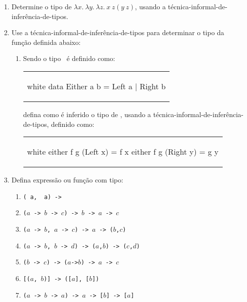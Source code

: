 \begin{enumerate}

\item Determine o tipo de $\lambda x.\:\lambda y.\:\lambda z.\:x\: z
  (y\: z)$, usando a técnica-informal-de-inferência-de-tipos.

\item Use a técnica-informal-de-inferência-de-tipos para determinar o
  tipo da função  definida abaixo:

  \begin{enumerate}

  \item Sendo o tipo \Either\ é definido como:
\begin{center}
\begin{tabular}{l}
\begin{alg}{.9\textwidth}{white}
  data Either a b = Left a | Right b
\end{alg}
\end{tabular}
\end{center}  
defina como é inferido o tipo de , usando a
técnica-informal-de-inferência-de-tipos, definido como:
\begin{center}
\begin{tabular}{l}
\begin{alg}{.9\textwidth}{white}
    either f g (Left x)  =  f x
    either f g (Right y) =  g y
\end{alg}
\end{tabular}
\end{center}  

  \end{enumerate}
  
\item Defina expressão ou função com tipo:

  \begin{enumerate}

  \item {\tt (\Ord\ a, \Show\ a) -> \String}

  \item {\tt ($a$ -> $b$ -> $c$) -> $b$ -> $a$ -> $c$}

  \item {\tt ($a$ -> $b$, $a$ -> $c$) -> $a$ -> ($b$,$c$)}

  \item {\tt ($a$ -> $b$, $b$ -> $d$) -> ($a$,$b$) -> ($c$,$d$)}

  \item {\tt ($b$ -> $c$) -> ($a$->$b$) -> $a$ -> $c$}
  
  \item {\tt [($a$, $b$)] -> ([$a$], [$b$])}

  \item {\tt ($a$ -> $b$ -> $a$) -> $a$ -> [$b$] -> [$a$]}

  \end{enumerate}
    
\end{enumerate}
